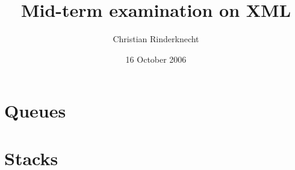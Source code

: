 \documentclass[11pt,a4paper]{article}
\title{Mid-term examination on XML}
\author{Christian Rinderknecht}
\date{16 October 2006}
\begin{document}
\maketitle

\thispagestyle{empty}

\section{Queues}



\section{Stacks}



\end{document}
